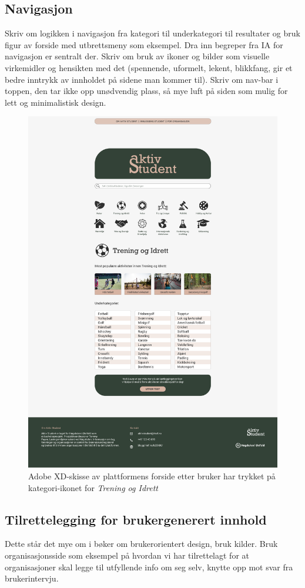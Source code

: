 \subsection{Navigasjon}
Skriv om logikken i navigasjon fra kategori til underkategori til resultater og bruk figur av forside med utbrettsmeny som eksempel. Dra inn begreper fra IA for navigasjon er sentralt der. Skriv om bruk av ikoner og bilder som visuelle virkemidler og hensikten med det (spennende, uformelt, lekent, blikkfang, gir et bedre inntrykk av innholdet på sidene man kommer til). Skriv om nav-bar i toppen, den tar ikke opp unødvendig plass, så mye luft på siden som mulig for lett og minimalistisk design.

\begin{figure}[H]
\centering
\includegraphics[width=.7\textwidth]{Illustrasjoner/Skisser-pdf/3.0/3-2-forside-trykket-kategori.pdf}
\caption{Adobe XD-skisse av plattformens forside etter bruker har trykket på kategori-ikonet for {\em Trening og Idrett}}
\label{fig:3-2-forside-utbrett}
\end{figure}

\subsection{Tilrettelegging for brukergenerert innhold}
Dette står det mye om i bøker om brukerorientert design, bruk kilder. Bruk organisasjonsside som eksempel på hvordan vi har tilrettelagt for at organisasjoner skal legge til utfyllende info om seg selv, knytte opp mot svar fra brukerintervju.


